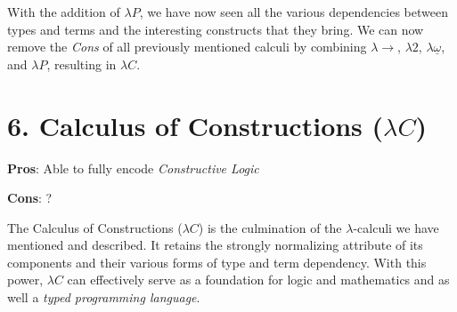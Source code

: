 \documentclass[9pt,preprint,nocopyrightspace,computermodern]{sigplanconf} %
\begin{document}
With the addition of \(\lambda P\), we have now seen all the various dependencies between
types and terms and the interesting constructs that they bring. We can now remove
the \textit{Cons} of all previously mentioned calculi by combining \(\lambda\!\!\rightarrow\),
\(\lambda 2\), \(\lambda\underline\omega\), and \(\lambda P\), resulting in \(\lambda C\).

\section*{6. Calculus of Constructions (\(\lambda C\))}
\begin{flushleft}
  \textbf{Pros}: Able to fully encode \textit{Constructive Logic}
  \par  
  \textbf{Cons}: ?
\end{flushleft}
The Calculus of Constructions (\(\lambda C\)) is the culmination of the \(\lambda\)-calculi
we have mentioned and described. It retains the strongly normalizing attribute of
its components and their various forms of type and term dependency. With this power,
\(\lambda C\) can effectively serve as a foundation for logic and mathematics and
as well a \textit{typed programming language}.
\end{document}
